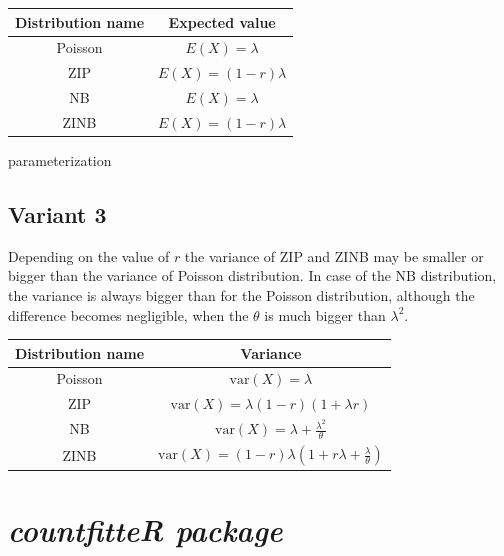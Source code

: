 \begin{center}
\begin{tabular}{ |c|c| } 
\hline
\bfseries Distribution name & \bfseries Expected value \\
\hline
Poisson & $E(X) = \lambda $ \\
\hline
ZIP & $E(X) = (1 - r) \lambda $ \\
\hline
NB & $E(X) = \lambda $ \\
\hline
ZINB & $E(X) = (1 - r)  \lambda $  \\
\hline
\end{tabular}
\end{center}parameterization

\subsection{Variant 3}

Depending on the value of $r$ the variance of ZIP and ZINB may be smaller or bigger than the variance of Poisson distribution. In case of the NB distribution, the variance is always bigger than for the Poisson distribution, although the difference becomes negligible, when the $\theta$ is much bigger than $\lambda^2$.

\begin{center}
\begin{tabular}{ |c|c| } 
\hline
\bfseries Distribution name & \bfseries Variance \\
\hline
Poisson & $\textrm{var}(X) = \lambda $ \\
\hline
ZIP & $\textrm{var}(X) = \lambda (1 - r)(1 + \lambda r)$ \\
\hline
NB & $\textrm{var}(X) = \lambda + \frac{\lambda^2}{\theta} $ \\
\hline
ZINB & $\textrm{var}(X) = (1 - r) \lambda \left( 1 + r\lambda  + \frac{\lambda}{\theta} \right)$ \\
\hline
\end{tabular}
\end{center}


\section{\emph{countfitteR package}}


